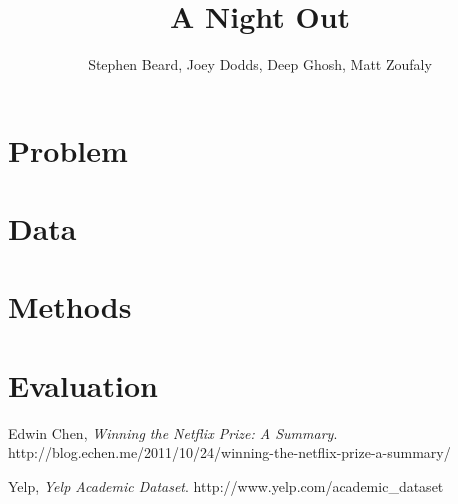 \documentclass[12pt]{article}
\begin{document}

\title{A Night Out}
\author{Stephen Beard, Joey Dodds, Deep Ghosh, Matt Zoufaly}
\maketitle

\section{Problem}

\newcommand{\bestRMSE}{0.9307 }
\newcommand{\bestRMSEnsp}{0.9307}
\newcommand{\bestK}{48 }
\newcommand{\bestNetflixRMSE}{0.8712 }
\newcommand{\bestNetflixRMSEnsp}{0.8712}
\newcommand{\netDiff}{0.06 }

\newcommand{\numBusCA}{707 } 
\newcommand{\numBusTotal}{2,452 }
\newcommand{\numUserTotal}{1,799 }

\newcommand{\numRatingCA}{8,970 } 
\newcommand{\numRatingTotal}{28,310 }

\section{Data}


\section{Methods}


\section{Evaluation}


\begin{thebibliography}{9}

  Edwin Chen,
  \emph{Winning the Netflix Prize: A Summary}.
  http://blog.echen.me/2011/10/24/winning-the-netflix-prize-a-summary/

  Yelp,
  \emph{Yelp Academic Dataset}.
  http://www.yelp.com/academic\_dataset 


\end{thebibliography}
\end{document}

